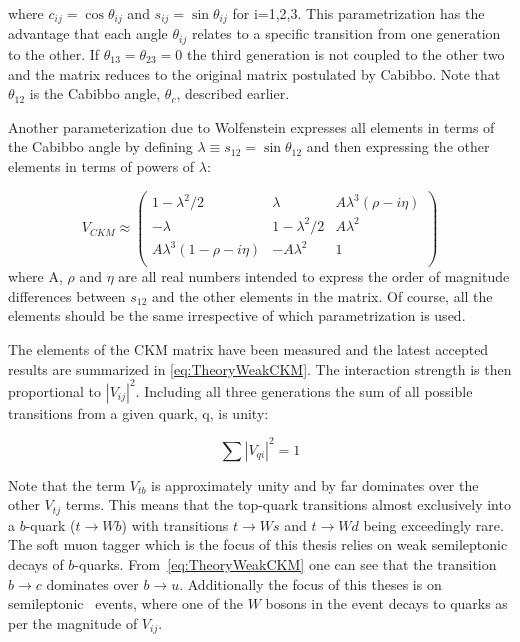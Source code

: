 where $c_{ij}=\cos\theta_{ij}$ and $s_{ij}=\sin\theta_{ij}$ for i=1,2,3. This parametrization has the advantage that each angle $\theta_{ij}$ relates to a specific transition from one generation to the other. If $\theta_{13} = \theta_{23} = 0$ the third generation is not coupled to the other two and the matrix reduces to the original matrix postulated by Cabibbo. Note that $\theta_{12}$ is the Cabibbo angle, $\theta_c$, described earlier.

Another parameterization due to Wolfenstein \cite{Theory:CKMWolfenstein} expresses all elements in terms of the Cabibbo angle by defining $\lambda\equiv s_{12}=\sin \theta_{12}$ and then expressing the other elements in terms of powers of $\lambda$:

\begin{equation}
\label{eq:TheoryWeakCKMWolfenstein}
V_{CKM}
\approx
\begin{pmatrix}
1-\lambda^2/2 & \lambda & A\lambda^3(\rho-i\eta) \\
-\lambda & 1-\lambda^2/2 & A\lambda^2 \\ 
A\lambda^3(1-\rho-i\eta) & -A\lambda^2 & 1\\
\end{pmatrix}
\end{equation}
%
where A, $\rho$ and $\eta$ are all real numbers intended to express the order of magnitude differences between $s_{12}$ and the other elements in the matrix. Of course, all the elements should be the same irrespective of which parametrization is used.

The elements of the CKM matrix have been measured and the latest accepted results are summarized in \ref{eq:TheoryWeakCKM}\cite{Theory:PDGBooklet}. The interaction strength is then proportional to $|V_{ij}|^{2}$. Including all three generations the sum of all possible transitions from a given quark, q, is unity:

\begin{equation} 
  \label{eq:TheoryWeakMixingTotal}
  \sum|V_{qi}|^{2}=1
\end{equation}

Note that the term $V_{tb}$ is approximately unity and by far dominates over the other $V_{tj}$ terms. This means that the top-quark transitions almost exclusively into a $b$-quark ($t\rightarrow Wb$) with transitions $t\rightarrow Ws$ and $t\rightarrow Wd$ being exceedingly rare. The soft muon tagger which is the focus of this thesis relies on weak semileptonic decays of $b$-quarks. From~\ref{eq:TheoryWeakCKM} one can see that the transition $b\rightarrow c$ dominates over $b\rightarrow u$. Additionally the focus of this theses is on semileptonic \ttbar\ events, where one of the $W$ bosons in the event decays to quarks as per the magnitude of $V_{ij}$.

